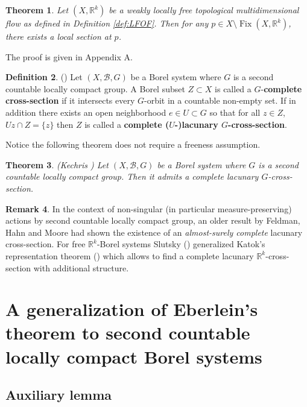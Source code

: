 \documentclass[11pt]{article}
\theoremstyle{plain}
\newtheorem{thm}{Theorem}[section]
\theoremstyle{definition}
\newtheorem{defn}[thm]{Definition}
\newtheorem{rem}[thm]{Remark}
\DeclareMathOperator{\Fix}{Fix}
\def\Rk{\mathbb{R}^k}
\numberwithin{figure}{section}
\begin{document}
\begin{thm}\label{thm:local section}
    Let $(X,\mathbb{R}^k)$ be a weakly locally free topological multidimensional flow as defined in Definition \ref{def:LFOF}. Then for any $p\in X\setminus\Fix(X,\mathbb{R}^k)$, there exists a local section at $p$.
\end{thm}
The proof is given in Appendix A.


\begin{defn}\label{def:Borel cross-section}(\cite{Kechris1992})
  Let $(X,\mathcal{B}, G)$ be a Borel system where $G$ is a second countable locally compact group. A Borel subset $Z\subset X$ is called a  $G$-\textbf{complete cross-section} if it intersects every $G$-orbit in a countable non-empty set.  If in addition  there exists an open neighborhood $e\in U\subset G$ so that for all $z\in Z$,
  $Uz\cap Z=\{z\}$ then $Z$ is called a \textbf{complete \mbox{($U$-)lacunary} $G$-cross-section}.
\end{defn}


Notice the following theorem does not require a freeness assumption.
\begin{thm}\label{thm:lacunary cross-section} (Kechris \cite[Corollary 1.2]{Kechris1992})
    Let $(X,\mathcal{B}, G)$ be a Borel system where $G$ is a second countable locally compact group. Then it admits  a complete lacunary $G$-cross-section. 
\end{thm}
\begin{rem}
 In the context of  non-singular (in particular measure-preserving) actions by second countable locally compact group, an older result by Feldman, Hahn and Moore \cite[Theorem 2.8]{FeldmanHahnMoore1979} had shown the existence of an  \textit{almost-surely complete} lacunary cross-section. For  free $\Rk$-Borel systems Slutsky  (\cite[Theorem 4.3]{Slu23}) generalized Katok's representation theorem (\cite{Kat77}) which allows to find a  complete lacunary $\Rk$-cross-section with additional structure.    
\end{rem}





\section{A generalization of Eberlein's theorem to second countable locally compact Borel systems}

\subsection{Auxiliary lemma}  
\end{document}
